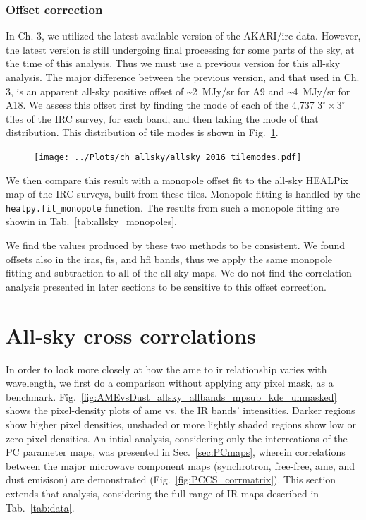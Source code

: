     \subsubsection{Offset correction}
    In Ch. 3, we utilized the latest available version of the AKARI/\acrshort{irc} data. However, the latest version is still undergoing final processing for some parts of the sky, at the time of this analysis. Thus we must use a previous version for this all-sky analysis. The major difference between the previous version, and that used in Ch. 3, is an apparent all-sky positive offset of \textasciitilde{}2~MJy/sr for A9 and \textasciitilde{}4~MJy/sr for A18. We assess this offset first by finding the mode of each of the 4,737 $3^{\circ}\times3^{\circ}$ tiles of the IRC survey, for each band, and then taking the mode of that distribution. This distribution of tile modes is shown in Fig.~\ref{fig:allsky_2016_tilemodes}.
        \begin{figure}
          \texttt{[image: ../Plots/ch\_allsky/allsky\_2016\_tilemodes.pdf]}
          \centering
          \caption{}
          \label{fig:allsky_2016_tilemodes}
        \end{figure}
      We then compare this result with a monopole offset fit to the all-sky HEALPix map of the IRC surveys, built from these tiles. Monopole fitting is handled by the {\tt healpy.fit\_monopole} function. The results from such a monopole fitting are showin in Tab.~\ref{tab:allsky_monopoles}.
        \begin{table}
          \centering
          \caption{}
          \label{tab:allsky_monopoles}
        \end{table}
      We find the values produced by these two methods to be consistent. We found offsets also in the \acrshort{iras}, \acrshort{fis}, and \acrshort{hfi} bands, thus we apply the same monopole fitting and subtraction to all of the all-sky maps. We do not find the correlation analysis presented in later sections to be sensitive to this offset correction.

  \section{All-sky cross correlations}
        In order to look more closely at how the \acrshort{ame} to \acrshort{ir} relationship varies with wavelength, we first do a comparison without applying any pixel mask, as a benchmark. Fig.~\ref{fig:AMEvsDust_allsky_allbands_mpsub_kde_unmasked} shows the pixel-density plots of \acrshort{ame} vs. the IR bands' intensities. Darker regions show higher pixel densities, unshaded or more lightly shaded regions show low or zero pixel densities. An intial analysis, considering only the interreations of the PC parameter maps, was presented in Sec.~\ref{sec:PCmaps}, wherein correlations between the major microwave component maps (synchrotron, free-free, \acrshort{ame}, and dust emisison) are demonstrated (Fig.~\ref{fig:PCCS_corrmatrix}). This section extends that analysis, considering the full range of IR maps described in Tab.~\ref{tab:data}.

